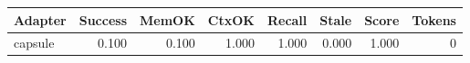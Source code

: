 \begin{tabular}{lrrrrrrr}
\hline
Adapter & Success & MemOK & CtxOK & Recall & Stale & Score & Tokens \\
\hline
capsule & 0.100 & 0.100 & 1.000 & 1.000 & 0.000 & 1.000 & 0 \\
\hline
\end{tabular}
